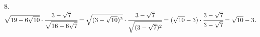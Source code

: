 8. $\sqrt{19-6\sqrt{10}}\cdot\cfrac{3-\sqrt{7}}{\sqrt{16-6\sqrt{7}}}=\sqrt{(3-\sqrt{10})^2}\cdot\cfrac{3-\sqrt{7}}{\sqrt{(3-\sqrt{7})^2}}=
(\sqrt{10}-3)\cdot\cfrac{3-\sqrt{7}}{3-\sqrt{7}}=\sqrt{10}-3.$\\

